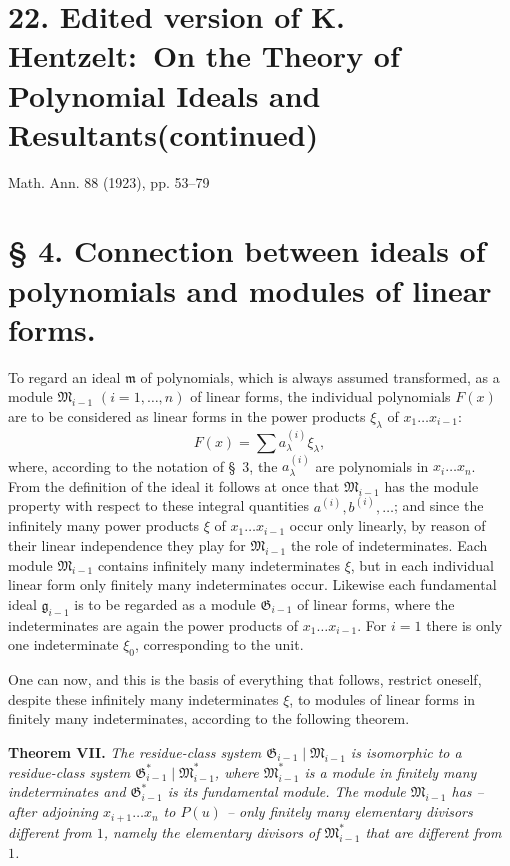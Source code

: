 \documentclass[11pt]{article}
\providecommand{\Gmod}{\mathfrak G}
\providecommand{\Mmod}{\mathfrak M}
\providecommand{\mideal}{\mathfrak m}
\providecommand{\gideal}{\mathfrak g}
\begin{document}
\setcounter{footnote}{0}

\section*{22. Edited version of K. Hentzelt:\ On the Theory of Polynomial Ideals and Resultants\quad (continued)}
\begin{center}
Math. Ann. 88 (1923), pp. 53--79
\end{center}

\section*{§ 4. Connection between ideals of polynomials and modules of linear forms.}

To regard an ideal $\mideal$ of polynomials, which is always assumed transformed, as a module $\Mmod_{i-1}$ $(i=1,
\ldots,n)$ of linear forms, the individual polynomials $F(x)$ are to be considered as linear forms in the power products $\xi_\lambda$ of $x_1\ldots x_{i-1}$:
\[
 F(x)=\sum a^{(i)}_\lambda\xi_\lambda,
\]
where, according to the notation of §~3, the $a^{(i)}_\lambda$ are polynomials in $x_i\ldots x_n$. From the definition of the ideal it follows at once that $\Mmod_{i-1}$ has the module property with respect to these integral quantities $a^{(i)},b^{(i)},\ldots$; and since the infinitely many power products $\xi$ of $x_1\ldots x_{i-1}$ occur only linearly, by reason of their linear independence they play for $\Mmod_{i-1}$ the role of indeterminates. Each module $\Mmod_{i-1}$ contains infinitely many indeterminates $\xi$, but in each individual linear form only finitely many indeterminates occur. Likewise each fundamental ideal $\gideal_{i-1}$ is to be regarded as a module $\Gmod_{i-1}$ of linear forms, where the indeterminates are again the power products of $x_1\ldots x_{i-1}$. For $i=1$ there is only one indeterminate $\xi_0$, corresponding to the unit.

One can now, and this is the basis of everything that follows, restrict oneself, despite these infinitely many indeterminates $\xi$, to modules of linear forms in finitely many indeterminates, according to the following theorem.

\medskip
\noindent\textbf{Theorem VII.} \emph{The residue-class system $\Gmod_{i-1}\mid\Mmod_{i-1}$ is isomorphic to a residue-class system $\Gmod^*_{i-1}\mid\Mmod^*_{i-1}$, where $\Mmod^*_{i-1}$ is a module in finitely many indeterminates and $\Gmod^*_{i-1}$ is its fundamental module. The module $\Mmod_{i-1}$ has -- after adjoining $x_{i+1}\ldots x_n$ to $P(u)$ -- only finitely many elementary divisors different from $1$, namely the elementary divisors of $\Mmod^*_{i-1}$ that are different from $1$.}
\end{document}
